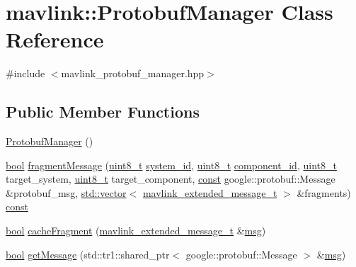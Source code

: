 \hypertarget{classmavlink_1_1_protobuf_manager}{\section{mavlink\-:\-:Protobuf\-Manager Class Reference}
\label{classmavlink_1_1_protobuf_manager}
}


{\ttfamily \#include $<$mavlink\-\_\-protobuf\-\_\-manager.\-hpp$>$}

\subsection*{Public Member Functions}
\begin{DoxyCompactItemize}
\item 
\hyperlink{classmavlink_1_1_protobuf_manager_aa8dce3fa593f0812016ff7ee1f22c533}{Protobuf\-Manager} ()
\item 
\hyperlink{group___exported__types_gaf6a258d8f3ee5206d682d799316314b1}{bool} \hyperlink{classmavlink_1_1_protobuf_manager_ac576df9f0a9868e8277ffb9a1f79e0ec}{fragment\-Message} (\hyperlink{stdint_8h_aba7bc1797add20fe3efdf37ced1182c5}{uint8\-\_\-t} \hyperlink{mavlink__helpers_8h_a01c34a374ac225c8b00a81e5877128e6}{system\-\_\-id}, \hyperlink{stdint_8h_aba7bc1797add20fe3efdf37ced1182c5}{uint8\-\_\-t} \hyperlink{mavlink__helpers_8h_a5287cd89840e4652c64e08aad69c848b}{component\-\_\-id}, \hyperlink{stdint_8h_aba7bc1797add20fe3efdf37ced1182c5}{uint8\-\_\-t} target\-\_\-system, \hyperlink{stdint_8h_aba7bc1797add20fe3efdf37ced1182c5}{uint8\-\_\-t} target\-\_\-component, \hyperlink{group___n_a_m_e_ga7ae6d0e43244213b34de2c2b9aa30da6}{const} google\-::protobuf\-::\-Message \&protobuf\-\_\-msg, \hyperlink{group___p_i_o_s_ga3c46a32d92954306e54f6e9acdd9eaac}{std\-::vector}$<$ \hyperlink{mavlink__types_8h_a2fb0ed65898193d6a151bd54553f24bf}{mavlink\-\_\-extended\-\_\-message\-\_\-t} $>$ \&fragments) \hyperlink{group___n_a_m_e_ga7ae6d0e43244213b34de2c2b9aa30da6}{const} 
\item 
\hyperlink{group___exported__types_gaf6a258d8f3ee5206d682d799316314b1}{bool} \hyperlink{classmavlink_1_1_protobuf_manager_a7b2e4d274a1cd43aeb09a753e74387c9}{cache\-Fragment} (\hyperlink{mavlink__types_8h_a2fb0ed65898193d6a151bd54553f24bf}{mavlink\-\_\-extended\-\_\-message\-\_\-t} \&\hyperlink{group___o_s_d_module_ga31fe24ba18a63ea1e8cdb622e7ece509}{msg})
\item 
\hyperlink{group___exported__types_gaf6a258d8f3ee5206d682d799316314b1}{bool} \hyperlink{classmavlink_1_1_protobuf_manager_ad3d191e0220dffa799eeda77efc2cdc5}{get\-Message} (std\-::tr1\-::shared\-\_\-ptr$<$ google\-::protobuf\-::\-Message $>$ \&\hyperlink{group___o_s_d_module_ga31fe24ba18a63ea1e8cdb622e7ece509}{msg})
\end{DoxyCompactItemize}


